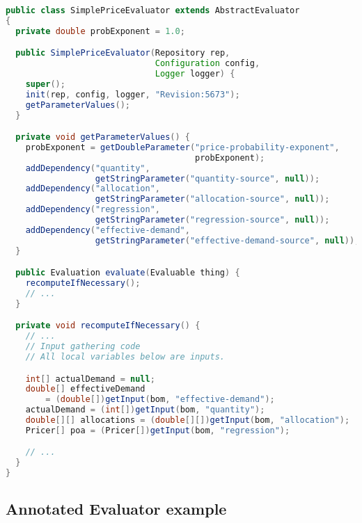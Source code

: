 \documentclass{article}
\begin{document}
{\small
\begin{lstlisting}[language={Java}]
public class SimplePriceEvaluator extends AbstractEvaluator
{
  private double probExponent = 1.0;

  public SimplePriceEvaluator(Repository rep,
                              Configuration config,
                              Logger logger) {
    super();
    init(rep, config, logger, "Revision:5673");
    getParameterValues();
  }

  private void getParameterValues() {
    probExponent = getDoubleParameter("price-probability-exponent",
                                      probExponent);
    addDependency("quantity",
                  getStringParameter("quantity-source", null));
    addDependency("allocation",
                  getStringParameter("allocation-source", null));
    addDependency("regression",
                  getStringParameter("regression-source", null));
    addDependency("effective-demand",
                  getStringParameter("effective-demand-source", null));
  }

  public Evaluation evaluate(Evaluable thing) {
    recomputeIfNecessary();
    // ...
  }

  private void recomputeIfNecessary() {
    // ...
    // Input gathering code
    // All local variables below are inputs.

    int[] actualDemand = null;
    double[] effectiveDemand
        = (double[])getInput(bom, "effective-demand");
    actualDemand = (int[])getInput(bom, "quantity");
    double[][] allocations = (double[][])getInput(bom, "allocation");
    Pricer[] poa = (Pricer[])getInput(bom, "regression");

    // ...
  }
}
\end{lstlisting}
}

\clearpage
\subsection{Annotated Evaluator example}
\label{sec:annotatedeval}
\end{document}
